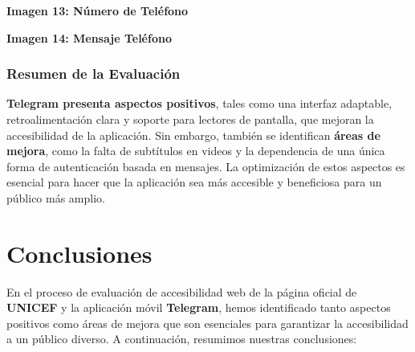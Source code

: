 \documentclass[a4paper]{article}
\newcommand{\numeroTelefono}{numeroTelefonoTelegram.jpg}
\newcommand{\mensajeTelefono}{mensajeTelefonoTelegram.jpg}
\begin{document}
\begin{itemize}
        \begin{center}
            \vspace{0.2cm}\par
            \textbf{Imagen 13: Número de Teléfono\label{fig:imagen-numero-telefono-telegram}}
        \end{center}\vspace{0.1cm}
        
        \begin{center}
            \vspace{0.2cm}\par
            \textbf{Imagen 14: Mensaje Teléfono\label{fig:imagen-mensaje-telefono-telegram}}
        \end{center}\vspace{0.1cm}
    \end{itemize}    
    
    
    \subsubsection{Resumen de la Evaluación}

    \textbf{Telegram presenta aspectos positivos}, tales como una interfaz adaptable, retroalimentación clara y soporte para lectores de pantalla, que mejoran la accesibilidad de la aplicación. Sin embargo, también se identifican \textbf{áreas de mejora}, como la falta de subtítulos en videos y la dependencia de una única forma de autenticación basada en mensajes. La optimización de estos aspectos es esencial para hacer que la aplicación sea más accesible y beneficiosa para un público más amplio.
    
    \section{Conclusiones}
    \label{sec:conclusiones_referencias}

    En el proceso de evaluación de accesibilidad web de la página oficial de \textbf{UNICEF} y la aplicación móvil \textbf{Telegram}, hemos identificado tanto aspectos positivos como áreas de mejora que son esenciales para garantizar la accesibilidad a un público diverso. A continuación, resumimos nuestras conclusiones:
    
\end{document}
